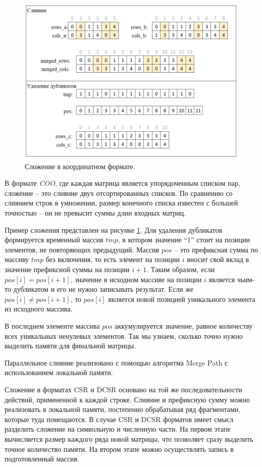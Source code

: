 \documentclass[14pt]{extarticle}
\begin{document}
	\begin{figure}
		\centering
		\includegraphics[width=0.8\linewidth]{picts/addition}
		\caption{Сложение в координатном формате.}
		\label{addition}
	\end{figure}
	
	
	В формате \textit{COO}, где каждая матрица является упорядоченным списком пар, сложение -- это слияние двух отсортированных списков. По сравнению со слиянием строк в умножении, размер конечного списка известен с большей точностью -- он не превысит суммы длин входных матриц. 
	
	Пример сложения представлен на рисунке \ref{addition}.  Для удаления дубликатов формируется временный массив $tmp$, в котором значение “1” стоит на позиции элементов, не повторяющих предыдущий. Массив $pos$ -- это префиксная сумма по массиву $tmp$ без включения, то есть элемент на позиции $i$ вносит свой вклад в значение префиксной суммы на позиции $i + 1$. Таким образом, если $pos[i] = pos[i + 1]$, значение в исходном массиве на позиции $i$ является чьим-то дубликатом и его не нужно записывать результат. Если же $pos[i] \neq pos[i + 1]$, то $pos[i]$ является новой позицией уникального элемента из исходного массива.
	
	В последнем элементе массива $pos$ аккумулируется значение, равное количеству всех уникальных ненулевых элементов. Так мы узнаем, сколько точно нужно выделить памяти для финальной матрицы.
	
	Параллельное слияние реализовано с помощью алгоритма Merge Path \cite{green} с использованием локальной памяти. 
	 
	Сложение в форматах CSR и DCSR основано на той же последовательности действий, примененной к каждой строке. Слияние и префиксную сумму можно реализовать в локальной памяти, постепенно обрабатывая ряд фрагментами, которые туда помещаются. В случае CSR и DCSR форматов имеет смысл разделить сложение на символьную и численную части. На первом этапе вычисляется размер каждого ряда новой матрицы, что позволяет сразу выделить точное количество памяти. На втором этапе можно осуществлять запись в подготовленный массив.  
		
\end{document}
